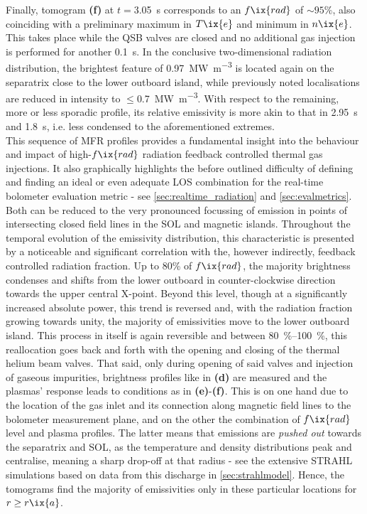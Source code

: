             Finally, tomogram \textbf{(f)} at $t=$\SI{3.05}{\second} corresponds  to an $f\ix{rad}$ of $\sim95\%$, also coinciding with a preliminary maximum in $T\ix{e}$ and minimum in $n\ix{e}$. This takes place while the QSB valves are closed and no additional gas injection is performed for another \SI{0.1}{\second}. In the conclusive two-dimensional radiation distribution, the brightest feature of \SI{0.97}{\mega\watt\per\cubic\meter} is located again on the separatrix close to the lower outboard island, while previously noted localisations are reduced in intensity to $\le$\SI{0.7}{\mega\watt\per\cubic\meter}. With respect to the remaining, more or less sporadic profile, its relative emissivity is more akin to that in \SI{2.95}{\second} and \SI{1.8}{\second}, i.e. less condensed to the aforementioned extremes.\\%
            This sequence of MFR profiles provides a fundamental insight into the behaviour and impact of high-$f\ix{rad}$ radiation feedback controlled thermal gas injections. It also graphically highlights the before outlined difficulty of defining and finding an ideal or even adequate LOS combination for the real-time bolometer evaluation metric - see \cref{sec:realtime_radiation} and \cref{sec:evalmetrics}. Both can be reduced to the very pronounced focussing of emission in points of intersecting closed field lines in the SOL and magnetic islands. Throughout the temporal evolution of the emissivity distribution, this characteristic is presented by a noticeable and significant correlation with the, however indirectly, feedback controlled radiation fraction. Up to 80\% of $f\ix{rad}$, the majority brightness condenses and shifts from the lower outboard in counter-clockwise direction towards the upper central X-point. Beyond this level, though at a significantly increased absolute power, this trend is reversed and, with the radiation fraction growing towards unity, the majority of emissivities move to the lower outboard island. This process in itself is again reversible and between \SIrange{80}{100}{\percent}, this reallocation goes back and forth with the opening and closing of the thermal helium beam valves. That said, only during opening of said valves and injection of gaseous impurities, brightness profiles like in \textbf{(d)} are measured and the plasmas' response leads to conditions as in \textbf{(e)}-\textbf{(f)}. This is on one hand due to the location of the gas inlet and its connection along magnetic field lines to the bolometer measurement plane, and on the other the combination of $f\ix{rad}$ level and plasma profiles. The latter means that emissions are \textit{pushed out} towards the separatrix and SOL, as the temperature and density distributions peak and centralise, meaning a sharp drop-off at that radius - see the extensive STRAHL simulations based on data from this discharge in \cref{sec:strahlmodel}. Hence, the tomograms find the majority of emissivities only in these particular locations for $r\ge r\ix{a}$.\\%
